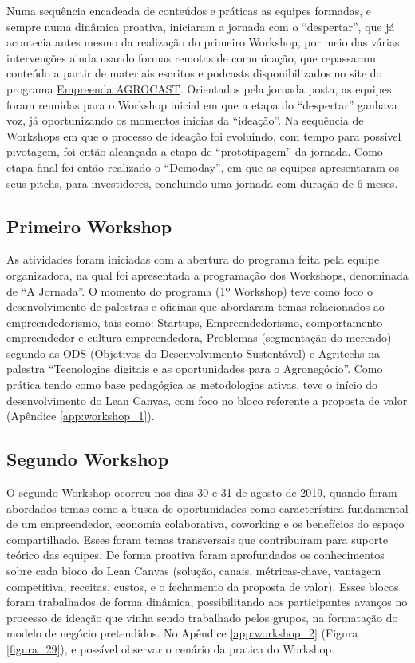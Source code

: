 Numa sequência encadeada de conteúdos e práticas as equipes formadas, e sempre numa dinâmica proativa, iniciaram a jornada com o “despertar”, que já acontecia antes mesmo da realização do primeiro Workshop, por meio das várias intervenções ainda usando formas remotas de comunicação, que repassaram conteúdo a partir de materiais escritos e  podcasts disponibilizados no site do programa \href{https://open.spotify.com/show/3c25hRSxvaCFPw6Y3lX3i1?si=9H_fGz_uRgGiFNhAcdr4rQ}{Empreenda AGROCAST}. Orientados pela jornada posta, as equipes foram reunidas para o Workshop inicial em que a etapa do “despertar” ganhava voz, já oportunizando os momentos inicias da “ideação”. Na sequência de Workshops em que o processo de ideação foi evoluindo, com tempo para possível pivotagem, foi então alcançada a etapa   de “prototipagem” da jornada. Como etapa final foi então realizado o “Demoday”, em que as equipes apresentaram os seus pitchs, para investidores, concluindo uma jornada com duração de 6 meses.


\subsection{Primeiro Workshop}

As atividades foram iniciadas com a abertura do programa feita pela equipe organizadora, na qual foi apresentada a programação dos Workshops, denominada de “A Jornada”. O momento do programa (1º Workshop) teve como foco o desenvolvimento de palestras e oficinas que abordaram temas relacionados ao empreendedorismo, tais como: Startups, Empreendedorismo, comportamento empreendedor e cultura empreendedora, Problemas (segmentação do mercado) segundo as ODS (Objetivos do Desenvolvimento Sustentável) e Agritechs na palestra “Tecnologias digitais e as oportunidades para o Agronegócio”. Como prática tendo como base pedagógica as metodologias ativas, teve o início do desenvolvimento do Lean Canvas, com foco no bloco referente a proposta de valor (Apêndice \ref{app:workshop_1}).



\subsection{Segundo Workshop}


O segundo Workshop ocorreu nos dias 30 e 31 de agosto de 2019, quando foram abordados temas como a busca de oportunidades como característica fundamental de um empreendedor, economia colaborativa, coworking e os benefícios do espaço compartilhado. Esses foram temas transversais que contribuíram para suporte teórico das equipes. De forma proativa foram aprofundados os conhecimentos sobre cada bloco do Lean Canvas (solução, canais, métricas-chave, vantagem competitiva, receitas, custos, e o fechamento da proposta de valor). Esses blocos foram trabalhados de forma dinâmica, possibilitando aos participantes avanços no processo de ideação que vinha sendo trabalhado pelos grupos, na formatação do modelo de negócio pretendidos. No Apêndice \ref{app:workshop_2}  (Figura \ref{figura_29}), 
e possível observar o cenário da pratica do Workshop.
 



